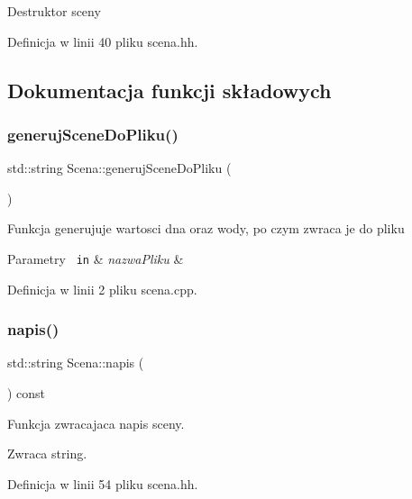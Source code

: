 Destruktor sceny 

Definicja w linii 40 pliku scena.\+hh.



\subsection{Dokumentacja funkcji składowych}
\mbox{\label{class_scena_ade795937f5293d5671f9e4930998fc42}} 
\subsubsection{\texorpdfstring{generujSceneDoPliku()}{generujSceneDoPliku()}}
{\footnotesize\ttfamily std\+::string Scena\+::generuj\+Scene\+Do\+Pliku (\begin{DoxyParamCaption}{ }\end{DoxyParamCaption})}

Funkcja generujuje wartosci dna oraz wody, po czym zwraca je do pliku


\begin{DoxyParams}[1]{Parametry}
\mbox{\texttt{ in}}  & {\em nazwa\+Pliku} & \\
\hline
\end{DoxyParams}


Definicja w linii 2 pliku scena.\+cpp.

\mbox{\label{class_scena_ab727dc0baa21dc3ef76f219f1d192e3f}} 
\subsubsection{\texorpdfstring{napis()}{napis()}}
{\footnotesize\ttfamily std\+::string Scena\+::napis (\begin{DoxyParamCaption}{ }\end{DoxyParamCaption}) const\hspace{0.3cm}{\ttfamily [inline]}}

Funkcja zwracajaca napis sceny.

\begin{DoxyReturn}{Zwraca}
string. 
\end{DoxyReturn}


Definicja w linii 54 pliku scena.\+hh.

